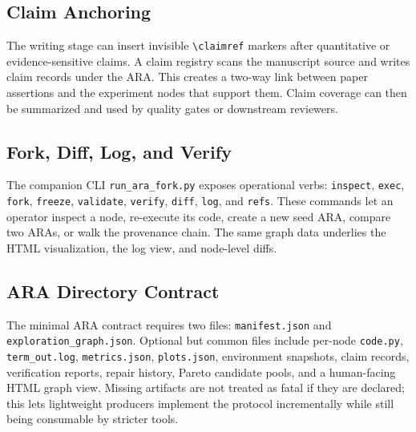 \documentclass[11pt]{article}
\begin{document}
\subsection{Claim Anchoring}

The writing stage can insert invisible \texttt{\textbackslash claimref}
markers after quantitative or evidence-sensitive claims. A claim registry
scans the manuscript source and writes claim records under the ARA. This
creates a two-way link between paper assertions and the experiment nodes that
support them. Claim coverage can then be summarized and used by quality gates
or downstream reviewers.

\subsection{Fork, Diff, Log, and Verify}

The companion CLI \texttt{run\_ara\_fork.py} exposes operational verbs:
\texttt{inspect}, \texttt{exec}, \texttt{fork}, \texttt{freeze},
\texttt{validate}, \texttt{verify}, \texttt{diff}, \texttt{log}, and
\texttt{refs}. These commands let an operator inspect a node, re-execute its
code, create a new seed ARA, compare two ARAs, or walk the provenance chain.
The same graph data underlies the HTML visualization, the log view, and
node-level diffs.

\subsection{ARA Directory Contract}

The minimal ARA contract requires two files: \texttt{manifest.json} and
\texttt{exploration\_graph.json}. Optional but common files include per-node
\texttt{code.py}, \texttt{term\_out.log}, \texttt{metrics.json},
\texttt{plots.json}, environment snapshots, claim records, verification
reports, repair history, Pareto candidate pools, and a human-facing HTML graph
view. Missing artifacts are not treated as fatal if they are declared; this
lets lightweight producers implement the protocol incrementally while still
being consumable by stricter tools.
\end{document}
